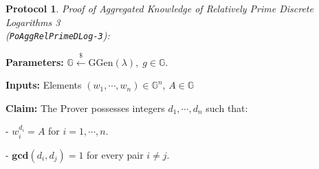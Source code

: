 \documentclass[11pt, lettersize, notitlepage, leqno, footskip=0.6cm]{article}
\newcommand{\mb}{\mathbb}
\newcommand{\mbf}{\mathbf}
\newcommand{\mr}{\mathrm}
\newcommand{\lamb}{\lambda}
\newcommand{\GCD}{\mbf{gcd}}
\newtheorem{Prot}[Thm]{Protocol}
\numberwithin{equation}{section}
\begin{document}
\vspace{0.1cm}



\begin{Prot} \normalfont \textit{Proof of Aggregated Knowledge of Relatively Prime Discrete Logarithms} 3\\ (\verb|PoAggRelPrimeDLog-3|):\end{Prot} \vspace{-0.3cm}

\noindent \textbf{Parameters:} $\mb{G}\xleftarrow{\$} \mr{GGen}(\lamb), \; g\in \mb{G}$.

\noindent \textbf{Inputs:} Elements $(w_1,\cdots, w_n)\in \mb{G}^n$, $A\in\mb{G}$

\noindent \textbf{Claim:} The Prover possesses integers $ d_1,\cdots, d_n$ such that:

\noindent - $w_i^{d_i} = A$ for $i = 1,\cdots,n$.

\noindent - $\GCD(d_i, d_j) = 1$ for every pair $i\neq j$.
\end{document}
